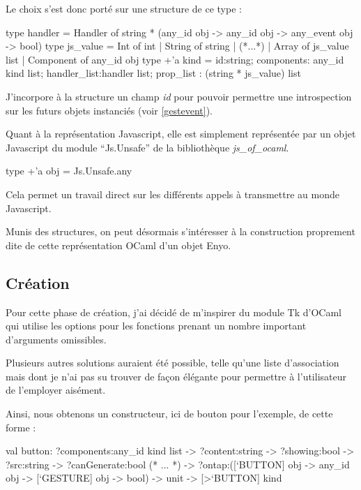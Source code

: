 Le choix s'est donc porté sur une structure de ce type :

\begin{OCaml}
  type handler = Handler of string * (any_id obj -> any_id obj -> any_event obj -> bool)
  type js_value = Int of int | String of string 
                | (*...*) 
                | Array of js_value list 
                | Component of any_id obj 
  type +'a kind = {id:string; 
                   components: any_id kind list; 
                   handler_list:handler list; 
                   prop_list : (string * js_value) list 
                  }
\end{OCaml}

J'incorpore à la structure un champ \emph{id} pour pouvoir permettre une introspection 
sur les futurs objets instanciés (voir \ref{gestevent}).

Quant à la représentation Javascript, elle est simplement représentée par un objet Javascript
du module ``Js.Unsafe'' de la bibliothèque \emph{js\_of\_ocaml}.

\begin{OCaml}
  type +'a obj = Js.Unsafe.any
\end{OCaml}

Cela permet un travail direct sur les différents appels à transmettre au monde Javascript.

Munis des structures, on peut désormais s'intéresser à la construction proprement dite de cette
représentation OCaml d'un objet Enyo.

\subsection{Création}

Pour cette phase de création, j'ai décidé de m'inspirer du module Tk d'OCaml qui utilise les options
pour les fonctions prenant un nombre important d'arguments omissibles.

Plusieurs autres solutions auraient été possible, telle qu'une liste d'association mais dont
je n'ai pas su trouver de façon élégante pour permettre à l'utilisateur de l'employer aisément.

Ainsi, nous obtenons un constructeur, ici de bouton pour l'exemple, de cette forme :

\begin{OCaml}
  val button:
    ?components:any_id kind list
    -> ?content:string
    -> ?showing:bool
    -> ?src:string
    -> ?canGenerate:bool
    (* ... *)
    -> ?ontap:([`BUTTON] obj -> 
               any_id obj -> 
               [`GESTURE] obj -> bool)
    -> unit -> [>`BUTTON] kind
\end{OCaml}

